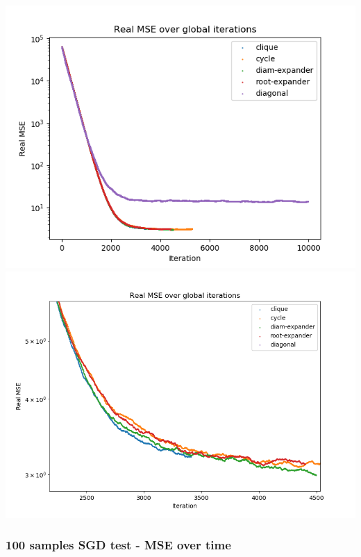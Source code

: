 \documentclass[11pt]{article}
\makeatletter
\def\maxwidth{\ifdim\Gin@nat@width>\linewidth\linewidth
    \else\Gin@nat@width\fi}
\let\Oldincludegraphics\includegraphics
\renewcommand{\includegraphics}[1]{\Oldincludegraphics[width=.8\maxwidth]{#1}}
\makeatother
\begin{document}
\includegraphics{media/img/tests/test_003_100samples_stochastic/2_real-mse_iter.png}
\includegraphics{media/img/tests/test_003_100samples_stochastic/2_real-mse_iter_zoom.png}

\subsubsection{100 samples SGD test - MSE over
time}\label{samples-sgd-test---mse-over-time}
\end{document}
